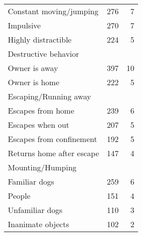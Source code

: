 \documentclass[varwidth=\maxdimen]{standalone}
\newcommand{\subrow}[1]{\hspace{1.25em}#1}
\begin{document}
\begin{tabular}[t]{lrr}
  \subrow{Constant moving/jumping}             &      276 &            7 \\
  \subrow{Impulsive}                           &      270 &            7 \\
  \subrow{Highly distractible}                 &      224 &            5 \\
Destructive behavior \\
  \subrow{Owner is away}                       &      397 &            10 \\
  \subrow{Owner is home}                       &      222 &            5 \\
Escaping/Running away \\
  \subrow{Escapes from home}                   &      239 &            6 \\
  \subrow{Escapes when out}                    &      207 &            5 \\
  \subrow{Escapes from confinement}            &      192 &            5 \\
  \subrow{Returns home after escape}           &      147 &            4 \\
Mounting/Humping \\
  \subrow{Familiar dogs}                       &      259 &            6 \\
  \subrow{People}                              &      151 &            4 \\
  \subrow{Unfamiliar dogs}                     &      110 &            3 \\
  \subrow{Inanimate objects}                   &      102 &            2 \\
\bottomrule
\end{tabular}
\end{document}
